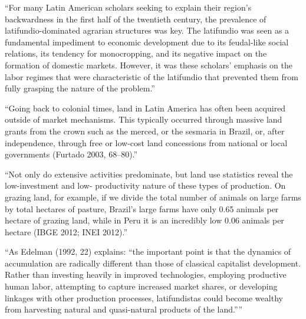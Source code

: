 \documentclass{article}
\begin{document}



\parencite{Carlson2019-mk}
``For many Latin American scholars seeking to explain their region’s backwardness in the first half of the  twentieth century, the prevalence of latifundio-dominated agrarian structures was key. The latifundio was  seen  as a  fundamental  impediment  to  economic  development  due  to  its  feudal-like  social  relations,  its   tendency for monocropping, and its negative impact on the formation of domestic markets. However, it  was these scholars’ emphasis on the labor regimes that were characteristic of the latifundio that prevented  them from fully grasping the nature of the problem.''

\parencite{Carlson2019-mk}
``Going back to colonial times, land in Latin America has often been acquired outside of market mechanisms.  This typically occurred through massive land grants from the crown such as the merced, or the sesmaria in  Brazil, or, after independence, through free or low-cost land concessions from national or local governments  (Furtado  2003,  68–80).''

\parencite{Carlson2019-mk}
``Not only do extensive activities predominate, but land use statistics reveal the low-investment and low- productivity nature of these types of production. On grazing land, for example, if we divide the total number  of animals on large farms by total hectares of pasture, Brazil’s large farms have only 0.65 animals per hectare  of grazing land, while in Peru it is an incredibly low 0.06 animals per hectare (IBGE 2012; INEI 2012).''

\parencite{Carlson2019-mk}
``As Edelman (1992, 22) explains: “the important point is that the dynamics of accumulation are 
radically different than those of classical capitalist development. Rather than investing heavily in improved  technologies,  employing  productive  human  labor,  attempting  to  capture  increased  market  shares,  or   developing linkages with other production processes, latifundistas could become wealthy from harvesting  natural and quasi-natural products of the land.”''
\end{document}
